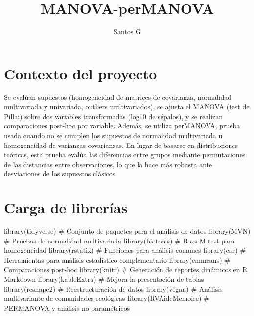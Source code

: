 \documentclass[
  spanish,
  11pt,
  a4paper,
  DIV=11,
  numbers=noendperiod]{scrartcl}
\title{MANOVA-perMANOVA}
\author{Santos G}
\date{}
\newenvironment{Shaded}{\begin{snugshade}}{\end{snugshade}}
\newcommand{\CommentTok}[1]{\textcolor[rgb]{0.37,0.37,0.37}{#1}}
\newcommand{\FunctionTok}[1]{\textcolor[rgb]{0.28,0.35,0.67}{#1}}
\newcommand{\NormalTok}[1]{\textcolor[rgb]{0.00,0.23,0.31}{#1}}
\renewcommand*\contentsname{Tabla de contenidos}
\newcommand\contentsname{Tabla de contenidos}
\begin{document}
\maketitle

\renewcommand*\contentsname{Tabla de contenidos}
{
\hypersetup{linkcolor=}
\setcounter{tocdepth}{2}
\tableofcontents
}

\section{Contexto del proyecto}\label{contexto-del-proyecto}

Se evalúan supuestos (homogeneidad de matrices de covarianza, normalidad
multivariada y univariada, outliers multivariados), se ajusta el MANOVA
(test de Pillai) sobre dos variables transformadas (log10 de sépalos), y
se realizan comparaciones post-hoc por variable. Además, se utiliza
perMANOVA, prueba usada cuando no se cumplen los supuestos de normalidad
multivariada u homogeneidad de varianzas-covarianzas. En lugar de
basarse en distribuciones teóricas, esta prueba evalúa las diferencias
entre grupos mediante permutaciones de las distancias entre
observaciones, lo que la hace más robusta ante desviaciones de los
supuestos clásicos.

\section{Carga de librerías}\label{carga-de-libreruxedas}

\begin{Shaded}
\begin{Highlighting}[numbers=left,,]
\FunctionTok{library}\NormalTok{(tidyverse)      }\CommentTok{\# Conjunto de paquetes para el análisis de datos}
\FunctionTok{library}\NormalTok{(MVN)            }\CommentTok{\# Pruebas de normalidad multivariada}
\FunctionTok{library}\NormalTok{(biotools)       }\CommentTok{\# Box\textquotesingle{}s M test para homogeneidad }
\FunctionTok{library}\NormalTok{(rstatix)        }\CommentTok{\# Funciones para análisis comunes }
\FunctionTok{library}\NormalTok{(car)            }\CommentTok{\# Herramientas para análisis estadístico complementario}
\FunctionTok{library}\NormalTok{(emmeans)        }\CommentTok{\# Comparaciones post{-}hoc}
\FunctionTok{library}\NormalTok{(knitr)          }\CommentTok{\# Generación de reportes dinámicos en R Markdown}
\FunctionTok{library}\NormalTok{(kableExtra)     }\CommentTok{\# Mejora la presentación de tablas}
\FunctionTok{library}\NormalTok{(reshape2)       }\CommentTok{\# Reestructuración de datos}
\FunctionTok{library}\NormalTok{(vegan)          }\CommentTok{\# Análisis multivariante de comunidades ecológicas}
\FunctionTok{library}\NormalTok{(RVAideMemoire)  }\CommentTok{\# PERMANOVA y análisis no paramétricos}
\end{Highlighting}
\end{Shaded}
\end{document}
